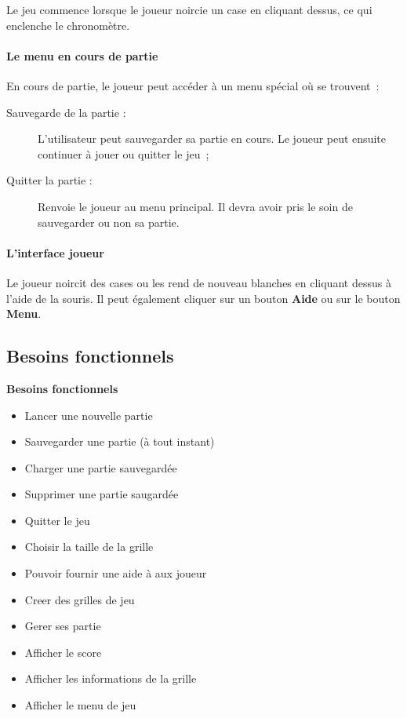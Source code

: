 \documentclass[11pt]{article}
\begin{document}
Le jeu commence lorsque le joueur noircie un case en cliquant dessus, ce qui enclenche le chronomètre. 

\paragraph{Le menu en cours de partie}

En cours de partie, le joueur peut accéder à un menu spécial où se trouvent~:


\begin{description}
    \item [Sauvegarde de la partie : ]L'utilisateur peut sauvegarder sa partie en cours. Le joueur peut ensuite continuer à jouer ou quitter le jeu~;
   \item [Quitter la partie : ]Renvoie le joueur au menu principal. Il devra avoir pris le soin de sauvegarder ou non sa partie.  
\end{description}


\paragraph{L'interface joueur}

Le joueur noircit des cases ou les rend de nouveau blanches en cliquant dessus à l'aide de la souris. Il peut également cliquer sur un bouton \textbf{Aide} ou sur le bouton \textbf{Menu}.





\subsection{Besoins fonctionnels}

\textbf{Besoins fonctionnels}
\begin{itemize}
    \item Lancer une nouvelle partie
    \item Sauvegarder une partie (à tout instant)
    \item Charger une partie sauvegardée
    \item Supprimer une partie saugardée
    \item Quitter le jeu
    \item Choisir la taille de la grille
    \item Pouvoir fournir une aide à aux joueur
    \item Creer des grilles de jeu
    \item Gerer ses partie
    \item Afficher le score
    \item Afficher les informations de la grille
    \item Afficher le menu de jeu
\end{itemize}
\end{document}
